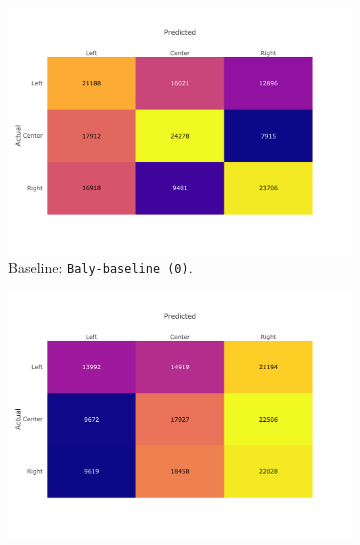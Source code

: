 \begin{figure}[!htbp]
    \centering
    \begin{subfigure}[b]{0.7\linewidth}
        \centering
        \includegraphics[trim={0 2cm 2cm 1cm},clip,width=\linewidth]{figures/nela_allsides_subset_media_balanced_confusion_matrix_bert.pdf}
        \caption{Baseline: \texttt{Baly-baseline (0)}.}
        \label{fig:nela_confusion_bert}
    \end{subfigure}
    \begin{subfigure}[b]{0.7\linewidth}
        \centering
        \includegraphics[trim={0 2cm 2cm 1cm},clip,width=\linewidth]{figures/nela_allsides_subset_media_balanced_confusion_matrix_propaganda_techniques_tf_idf.pdf}

\end{subfigure}
\end{figure}
